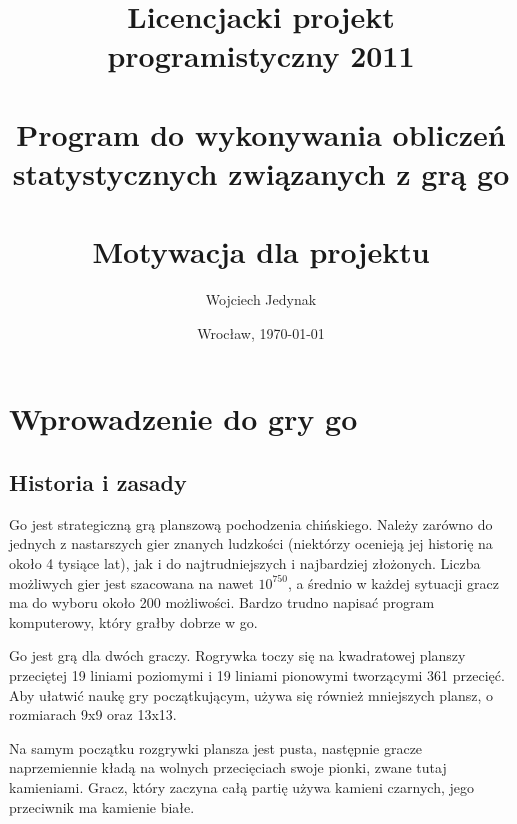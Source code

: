 \documentclass[11pt,leqno]{article}
\title{\LARGE Licencjacki projekt programistyczny 2011 \\ 
       \ \\
       Program do wykonywania obliczeń statystycznych związanych z grą go \\ 
       \ \\
       Motywacja dla projektu }
\author{Wojciech Jedynak}
\date{Wrocław, \today}
\begin{document}
\maketitle 

\thispagestyle{empty}
\tableofcontents

\newpage


\section{Wprowadzenie do gry go}

\subsection{Historia i zasady}

Go jest strategiczną grą planszową pochodzenia chińskiego. Należy zarówno do jednych z nastarszych gier znanych 
ludzkości (niektórzy ocenieją jej historię na około 4 tysiące lat), jak i do najtrudniejszych i najbardziej złożonych.
Liczba możliwych gier jest szacowana na nawet $ 10^{750} $, a średnio w każdej sytuacji gracz ma do wyboru około 200 możliwości.
Bardzo trudno napisać program komputerowy, który grałby dobrze w go. 

Go jest grą dla dwóch graczy. Rogrywka toczy się na kwadratowej planszy przeciętej 19 liniami poziomymi i 19 liniami pionowymi 
tworzącymi 361 przecięć. Aby ułatwić naukę gry  początkującym, używa się również mniejszych plansz, o rozmiarach 9x9 oraz 13x13. 

Na samym początku rozgrywki plansza jest pusta, następnie gracze naprzemiennie kładą na wolnych przecięciach swoje pionki, 
zwane tutaj kamieniami. Gracz, który zaczyna całą partię używa kamieni czarnych, jego przeciwnik ma kamienie białe.
\end{document}
